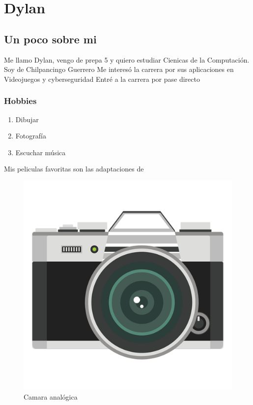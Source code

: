 \chapter{Dylan}

\section{Un poco sobre mi}
Me llamo Dylan, vengo de prepa 5 y quiero estudiar Cienicas de la Computación.
Soy de Chilpancingo Guerrero
Me interesó la carrera por sus aplicaciones en Videojuegos y cyberseguridad
Entré a la carrera por pase directo

\subsection{Hobbies}
\begin{enumerate}
\item Dibujar
\item Fotografía
\item Escuchar música
\end{enumerate}

Mis peliculas favoritas son las adaptaciones de~\cite{torres}

\begin{figure}[h]
  \centering
  \includegraphics[scale=0.5]{IMG/32.png}
  \caption{Camara analógica}
\end{figure}

